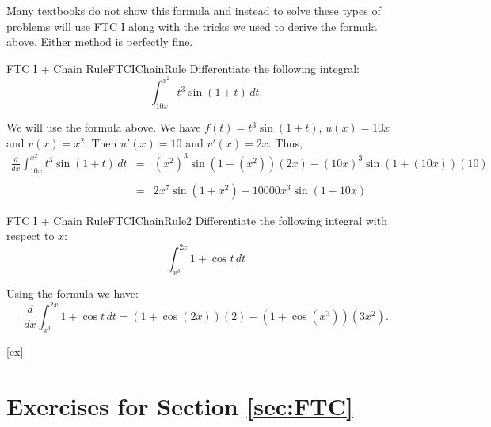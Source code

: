 Many textbooks do not show this formula and instead to solve these types of problems will use FTC I along with the tricks we used to derive the formula above.
Either method is perfectly fine.

\begin{example}{FTC I + Chain Rule}{FTCIChainRule}
Differentiate the following integral:
$$\int_{10x}^{x^2} t^3\sin(1+t) \,dt.$$
\end{example}

\begin{solution} 
We will use the formula above.
We have $f(t)=t^3\sin(1+t)$, $u(x)=10x$ and $v(x)=x^2$.
Then $u'(x)=10$ and $v'(x)=2x$.
Thus,
\begin{eqnarray*}
\frac{d}{dx}\int_{10x}^{x^2} t^3\sin(1+t) \,dt&=&(x^2)^3\sin(1+(x^2))(2x)-(10x)^3\sin(1+(10x))(10)\\
\\
&=&2x^7\sin(1+x^2)-10000x^3\sin(1+10x)
\end{eqnarray*}
\end{solution}

\begin{example}{FTC I + Chain Rule}{FTCIChainRule2}
Differentiate the following integral with respect to $x$:
$$\int_{x^3}^{2x} 1+\cos t\,dt$$
\end{example}

\begin{solution} 
Using the formula we have:
$$\frac{d}{dx}\int_{x^3}^{2x} 1+\cos t\,dt=(1+\cos(2x))(2)-(1+\cos(x^3))(3x^2).$$
\end{solution}


[ex]
\section*{Exercises for Section \ref{sec:FTC}}

